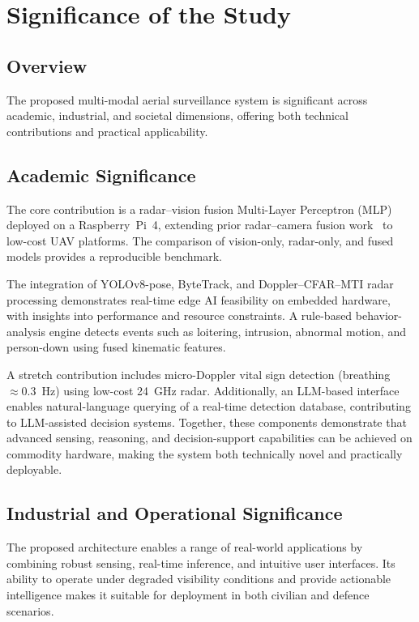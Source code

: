 \chapter{Significance of the Study}
\label{Significance}

\section{Overview}
The proposed multi-modal aerial surveillance system is significant across academic, industrial, and societal dimensions, offering both technical contributions and practical applicability.

\section{Academic Significance}

The core contribution is a radar--vision fusion Multi-Layer Perceptron (MLP) deployed on a Raspberry~Pi~4, extending prior radar--camera fusion work~\cite{nabati2021centerfusion,chadwick2019distantvehicle} to low-cost UAV platforms. The comparison of vision-only, radar-only, and fused models provides a reproducible benchmark.

The integration of YOLOv8-pose, ByteTrack, and Doppler--CFAR--MTI radar processing demonstrates real-time edge AI feasibility on embedded hardware, with insights into performance and resource constraints. A rule-based behavior-analysis engine detects events such as loitering, intrusion, abnormal motion, and person-down using fused kinematic features.

A stretch contribution includes micro-Doppler vital sign detection (breathing $\approx 0.3$~Hz) using low-cost 24~GHz radar. Additionally, an LLM-based interface enables natural-language querying of a real-time detection database, contributing to LLM-assisted decision systems. Together, these components demonstrate that advanced sensing, reasoning, and decision-support capabilities can be achieved on commodity hardware, making the system both technically novel and practically deployable.

\section{Industrial and Operational Significance}

The proposed architecture enables a range of real-world applications by combining robust sensing, real-time inference, and intuitive user interfaces. Its ability to operate under degraded visibility conditions and provide actionable intelligence makes it suitable for deployment in both civilian and defence scenarios.

